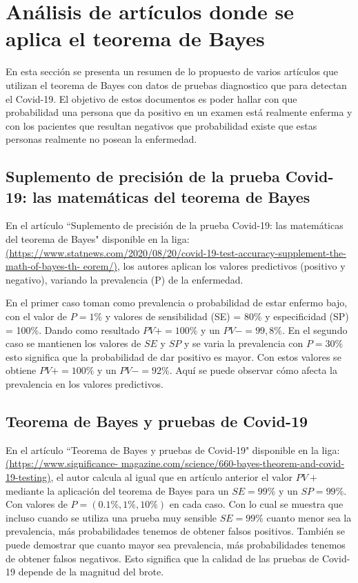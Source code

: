 \documentclass{article}
\begin{document}
\section{Análisis de artículos donde se aplica el teorema de Bayes}
En esta sección se presenta un resumen de lo propuesto de varios artículos que utilizan el teorema de Bayes con datos de pruebas diagnostico que para detectan el Covid-19. El objetivo de estos documentos es poder hallar con que probabilidad una persona que da positivo en un examen está realmente enferma y con los pacientes que resultan negativos que probabilidad existe que estas personas realmente no posean la enfermedad. 

\subsection{Suplemento de precisión de la prueba Covid-19: las matemáticas del teorema de Bayes}
En el artículo ``Suplemento de precisión de la prueba Covid-19: las matemáticas del teorema de Bayes" disponible en la liga: \href{https://www.statnews.com/2020/08/20/covid-19-test-accuracy-supplement-the-math-of-bayes-theorem/}{(https://www.statnews.com/2020/08/20/covid-19-test-accuracy-supplement-the-math-of-bayes-th-
eorem/)}, los autores aplican los valores predictivos (positivo y negativo), variando la prevalencia (P) de la enfermedad. 

En el primer caso toman como prevalencia o probabilidad de estar enfermo bajo, con el valor de $P = 1\%$ y valores de sensibilidad (SE) = 80\% y especificidad (SP) = 100\%. Dando como resultado $PV+ = 100\%$ y un $PV-= 99,8\%$. En el segundo caso se mantienen los valores de $SE$ y $SP$ y se varia la prevalencia con $P = 30\%$ esto significa que la probabilidad de dar positivo es mayor. Con estos valores se obtiene $PV+ = 100\%$ y un $PV-= 92\%$. Aquí se puede observar cómo afecta la prevalencia en los valores predictivos. 

\subsection{Teorema de Bayes y pruebas de Covid-19}
En el artículo ``Teorema de Bayes y pruebas de Covid-19" disponible en la liga:  \href{https://www.significancemagazine.com/science/660-bayes-theorem-and-covid-19-testing}{(https://www.significance-
magazine.com/science/660-bayes-theorem-and-covid-19-testing)}, el autor calcula al igual que en artículo anterior el valor $PV+$ mediante la aplicación del teorema de Bayes para un $SE = 99\%$ y un $SP = 99\%$. Con valores de $P = (0.1\%, 1\%, 10\%)$ en cada caso. Con lo cual se muestra que incluso cuando se utiliza una prueba muy sensible $SE = 99\%$ cuanto menor sea la prevalencia, más probabilidades tenemos de obtener falsos positivos. También se puede demostrar que cuanto mayor sea prevalencia, más probabilidades tenemos de obtener falsos negativos. Esto significa que la calidad de las pruebas de Covid-19 depende de la magnitud del brote.
\end{document}
